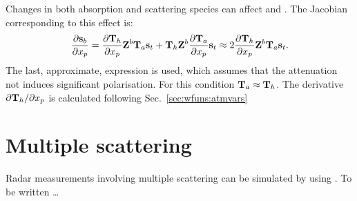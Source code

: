 Changes in both absorption and scattering species can affect  and
. The Jacobian corresponding to this effect is:
\begin{equation}
  \frac{\partial{\bf s}_{b}}{\partial x_{p}} = 
   \frac{\partial{\bf T}_{h}}{\partial x_{p}}{\bf Z}^b{\bf T}_{a}{\bf s}_{t} +
   {\bf T}_{h}{\bf Z}^b\frac{\partial{\bf T}_{a}}{\partial x_{p}}{\bf s}_{t} 
   \approx 2 \frac{\partial{\bf T}_{h}}{\partial x_{p}}{\bf Z}^b
   {\bf T}_{a}{\bf s}_{t}.
  \label{eq:wfuns:cradar2}
\end{equation}
The last, approximate, expression is used, which assumes that the attenuation
not induces significant polarisation. For this condition
${\bf T}_{a}\approx{\bf T}_{h}$. The derivative
$\partial{\bf T}_{h}/\partial x_{p}$ is calculated following
Sec.~\ref{sec:wfuns:atmvars}





\section{Multiple scattering}
\label{sec:cradar:multi}

Radar measurements involving multiple scattering can be simulated by using
. To be written \dots

